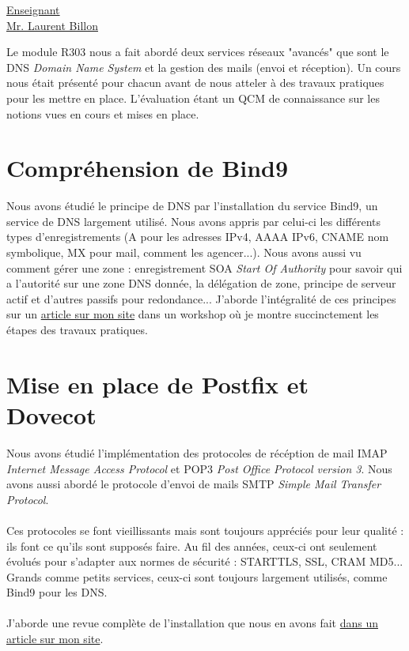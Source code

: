 \renewcommand{\figurename}{}

\vspace*{0.2cm}%
      \large
      \href{\@orientadorPagina}{\color{black}Enseignant\\Mr. Laurent Billon}\\%
      \normalsize
\vspace*{0.5cm}%

Le module R303 nous a fait abordé deux services réseaux "avancés" que sont le DNS \textit{Domain Name System} et la gestion des mails (envoi et réception). Un cours nous était présenté pour chacun avant de nous atteler à des travaux pratiques pour les mettre en place. L'évaluation étant un QCM de connaissance sur les notions vues en cours et mises en place.

\section{Compréhension de Bind9}

Nous avons étudié le principe de DNS par l'installation du service Bind9, un service de DNS largement utilisé. Nous avons appris par celui-ci les différents types d'enregistrements (A pour les adresses IPv4, AAAA IPv6, CNAME nom symbolique, MX pour mail, comment les agencer...). Nous avons aussi vu comment gérer une zone : enregistrement SOA \textit{Start Of Authority} pour savoir qui a l'autorité sur une zone DNS donnée, la délégation de zone, principe de serveur actif et d'autres passifs pour redondance... J'aborde l'intégralité de ces principes sur un \href{https://xeylou.fr/posts/bind9-workshop/}{article sur mon site} dans un workshop où je montre succinctement les étapes des travaux pratiques.

\section{Mise en place de Postfix et Dovecot}

Nous avons étudié l'implémentation des protocoles de récéption de mail IMAP \textit{Internet Message Access Protocol} et POP3 \textit{Post Office Protocol version 3}. Nous avons aussi abordé le protocole d'envoi de mails SMTP \textit{Simple Mail Transfer Protocol}.
\\ \\
Ces protocoles se font vieillissants mais sont toujours appréciés pour leur qualité : ils font ce qu'ils sont supposés faire. Au fil des années, ceux-ci ont seulement évolués pour s'adapter aux normes de sécurité : STARTTLS, SSL, CRAM MD5... Grands comme petits services, ceux-ci sont toujours largement utilisés, comme Bind9 pour les DNS.
\\ \\
J'aborde une revue complète de l'installation que nous en avons fait \href{https://xeylou.fr/posts/postfix-workshop/}{dans un article sur mon site}.

